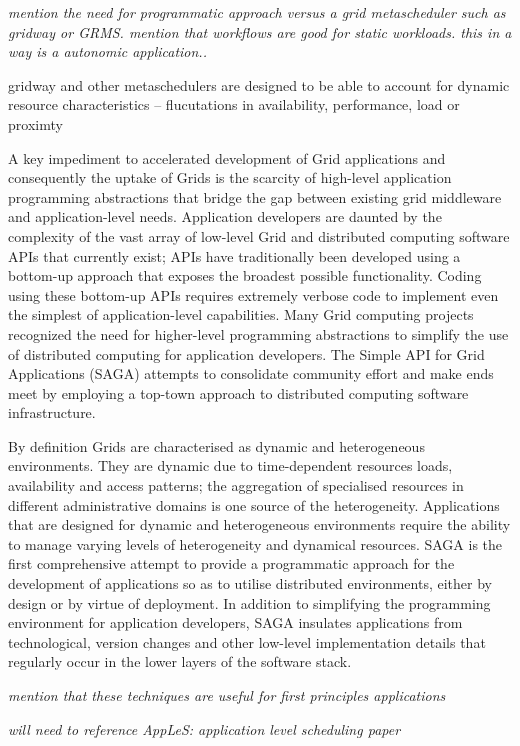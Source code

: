 \documentclass[conference,final]{IEEEtran}
\begin{document}
{\it mention the need for programmatic approach versus a grid
  metascheduler such as gridway or GRMS. mention that workflows are
  good for static workloads. this in a way is a autonomic
  application..}

gridway and other metaschedulers are designed to be able to account for
dynamic resource characteristics  -- flucutations in availability, performance, load or
proximty

A key impediment to accelerated development of Grid applications and
consequently the uptake of Grids is the scarcity of high-level
application programming abstractions that bridge the gap between
existing grid middleware and application-level needs.  Application
developers are daunted by the complexity of the vast array of
low-level Grid and distributed computing software APIs that currently
exist; APIs have traditionally been developed using a bottom-up
approach that exposes the broadest possible functionality.  Coding
using these bottom-up APIs requires extremely verbose code to
implement even the simplest of application-level capabilities.  Many
Grid computing projects~\cite{gat, cog, realitygrid} recognized the
need for higher-level programming abstractions to simplify the use of
distributed computing for application developers.  The Simple API for
Grid Applications (SAGA) attempts to consolidate community effort and
make ends meet by employing a top-town approach to distributed
computing software infrastructure.

By definition Grids are characterised as dynamic and heterogeneous
environments.  They are dynamic due to time-dependent resources loads,
availability and access patterns; the aggregation of specialised
resources in different administrative domains is one source of the
heterogeneity.  Applications that are designed for dynamic and
heterogeneous environments require the ability to manage varying
levels of heterogeneity and dynamical resources. SAGA is the first
comprehensive attempt to provide a programmatic approach for the
development of applications so as to utilise distributed environments,
either by design or by virtue of deployment.  In addition to
simplifying the programming environment for application developers,
SAGA insulates applications from technological, version changes and
other low-level implementation details that regularly occur in the
lower layers of the software stack.

{\it mention that these techniques are useful for first principles applications}

{\it will need to reference AppLeS: application level scheduling
  paper~\cite{apples03}}
\end{document}
